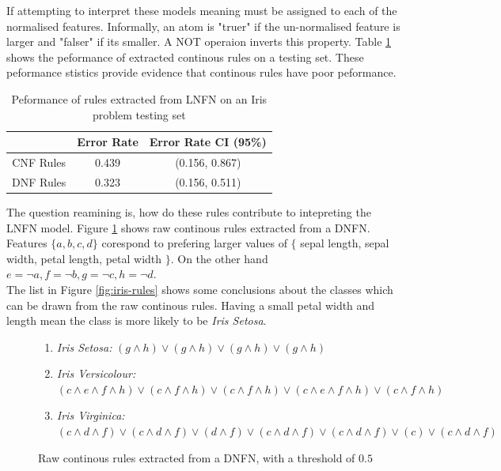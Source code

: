 If attempting to interpret these models meaning must be assigned to each of the normalised features. Informally, an atom is "truer" if the un-normalised feature is larger and "falser" if its smaller. A NOT operaion inverts this property. Table \ref{tab:iris-rule-peformance-comp} shows the peformance of extracted continous rules on a testing set. These peformance stistics provide evidence that continous rules have poor peformance.

\begin{table}[H]
	\begin{center}
		\begin{tabular}{| c | c | c |}
			\hline
			& Error Rate & Error Rate CI (95\%) \\
			\hline
			\hline
			CNF Rules & 0.439 & (0.156, 0.867) \\
			\hline
			DNF Rules & 0.323 & (0.156, 0.511) \\
			\hline
		\end{tabular}
	\end{center}
	\caption{Peformance of rules extracted from LNFN on an Iris problem testing set}
	\label{tab:iris-rule-peformance-comp}
\end{table}


\noindent
\begin{minipage}[t]{0.5\textwidth}
\vspace{0px}
The question reamining is, how do these rules contribute to intepreting the LNFN model. Figure \ref{fig:raw-iris-rules} shows raw continous rules extracted from a DNFN. Features $\{a,b,c,d\}$ corespond to prefering larger values of $\{$ sepal length, sepal width, petal length, petal width $\}$. On the other hand $e = \lnot a, f = \lnot b, g = \lnot c, h = \lnot d$.\\

The list in Figure \ref{fig:iris-rules} shows some conclusions about the classes which can be drawn from the raw continous rules. Having a small petal width and length mean the class is more likely to be \textit{Iris Setosa}. \\
\end{minipage}
\hspace{0.05\textwidth}
\begin{minipage}[t]{0.45\textwidth}
\vspace{0px}
\begin{figure}[H]
\begin{enumerate}
\item \textit{Iris Setosa:} $(g \land h) \lor (g \land h) \lor (g \land h) \lor (g \land h)$
\item \textit{Iris Versicolour:} $(c \land e \land f \land h) \lor (c \land f \land h) \lor (c \land f \land h) \lor (c \land e \land f \land h) \lor (c \land f \land h)$
\item \textit{Iris Virginica:} $(c \land d \land f) \lor (c \land d \land f) \lor (d \land f) \lor (c \land d \land f) \lor (c \land d \land f) \lor (c) \lor (c \land d \land f)$
\end{enumerate}
\caption{Raw continous rules extracted from a DNFN, with a threshold of $0.5$}
\label{fig:raw-iris-rules}
\end{figure}
\end{minipage}

